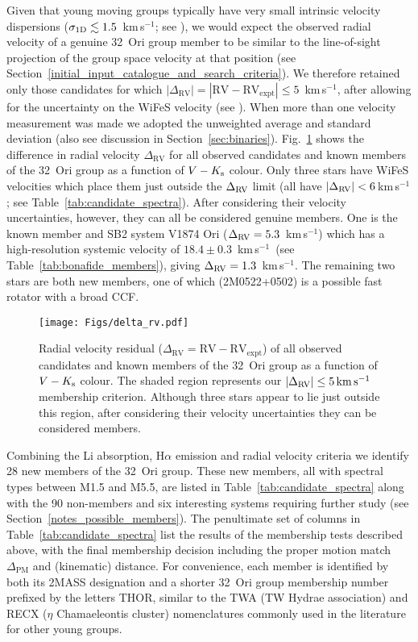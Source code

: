 \documentclass[usenatbib]{mnras}
\newcommand{\kms}{\textrm{km\,s$^{-1}$}}
\begin{document}
Given that young moving groups typically have very small intrinsic
velocity dispersions ($\sigma_{\rm 1D} \lesssim 1.5$~\kms; see
\citealp{Mamajek16}), we would expect the observed radial velocity of
a genuine 32~Ori group member to be similar to the line-of-sight projection
of the group space velocity at that position (see
Section~\ref{initial_input_catalogue_and_search_criteria}). We
therefore retained only those candidates for which
$|\Delta_{\mathrm{RV}}|=|\mathrm{RV}-\mathrm{RV_{expt}}| \leq 5$~\kms,
after allowing for the uncertainty on the WiFeS velocity (see
\citealp{Binks16}). When more than one velocity measurement was made
we adopted the unweighted average and standard deviation (also see
discussion in Section~\ref{sec:binaries}). Fig.~\ref{fig:delta_rv}
shows the difference in radial velocity $\Delta_{\mathrm{RV}}$ for all
observed candidates and known members of the 32~Ori group as a
function of $V-K_{\rm{s}}$ colour. Only three stars have WiFeS velocities which
place them just outside the $\Delta_{\rm{RV}}$ limit (all have
$|\Delta_{\rm{RV}}| < 6$\,\kms; see
Table~\ref{tab:candidate_spectra}). After considering their velocity
uncertainties, however, they can all be considered genuine
members. One is the known member and SB2 system V1874 Ori
($\Delta_{\rm RV}=5.3$~\kms) which has a high-resolution systemic
velocity of $18.4\pm0.3$~\kms\ (see Table~\ref{tab:bonafide_members}), giving $\Delta_{\rm
  RV}=1.3$~\kms. The remaining two stars are both new members, one of which
(2M0522+0502) is a possible fast rotator with a broad
CCF.

\begin{figure}
\centering
\texttt{[image: Figs/delta\_rv.pdf]}
\caption[]{Radial velocity residual
  ($\Delta_{\mathrm{RV}}=\mathrm{RV}-\mathrm{RV_{expt}}$) of all
  observed candidates and known members of the 32~Ori group as a function of
  $V-K_{\rm{s}}$ colour. The shaded region represents our
  $|\Delta_{\rm{RV}}| \leq 5\,\rm{km\,s^{-1}}$ membership
  criterion. Although three stars appear to lie just outside this
  region, after considering their velocity uncertainties they can be
  considered members.}
\label{fig:delta_rv}
\end{figure}

Combining the Li absorption, H$\alpha$ emission and radial velocity
criteria we identify 28 new members of the 32~Ori group. These new
members, all with spectral types between M1.5 and M5.5, are listed in
Table~\ref{tab:candidate_spectra} along with the 90 non-members and six
interesting systems requiring further study (see
Section~\ref{notes_possible_members}). The penultimate set of columns
in Table~\ref{tab:candidate_spectra} list the results of the
membership tests described above, with the final membership decision
including the proper motion match $\Delta_\textrm{PM}$ and (kinematic) distance.
For convenience, each member is identified by both its 2MASS designation and a shorter 32~Ori group membership number prefixed by the letters THOR,
similar to the TWA (TW Hydrae association) and RECX ($\eta$ Chamaeleontis cluster) nomenclatures commonly used in the literature for other young groups.
\end{document}
